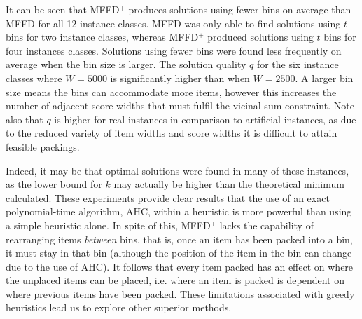 \documentclass[authoryear]{elsarticle}
\begin{document}
It can be seen that MFFD$^+$ produces solutions using fewer bins on average than MFFD for all 12 instance classes. MFFD was only able to find solutions using $t$ bins for two instance classes, whereas MFFD$^+$ produced solutions using $t$ bins for four instances classes. Solutions using fewer bins were found less frequently on average when the bin size is larger. The solution quality $q$ for the six instance classes where $W = 5000$ is significantly higher than when $W = 2500$. A larger bin size means the bins can accommodate more items, however this increases the number of adjacent score widths that must fulfil the vicinal sum constraint. Note also that $q$ is higher for real instances in comparison to artificial instances, as due to the reduced variety of item widths and score widths it is difficult to attain feasible packings. 

Indeed, it may be that optimal solutions were found in many of these instances, as the lower bound for $k$ may actually be higher than the theoretical minimum calculated. These experiments provide clear results that the use of an exact polynomial-time algorithm, AHC, within a heuristic is more powerful than using a simple heuristic alone. In spite of this, MFFD$^+$ lacks the capability of rearranging items \emph{between} bins, that is, once an item has been packed into a bin, it must stay in that bin (although the position of the item in the bin can change due to the use of AHC). It follows that every item packed has an effect on where the unplaced items can be placed, i.e. where an item is packed is dependent on where previous items have been packed. These limitations associated with greedy heuristics lead us to explore other superior methods.

\begin{comment}
{\color{myPink}
\begin{itemize}[leftmargin=*]
	\item Number of types on average real instances.
	\item Number of items per bin.
\end{itemize}
}
\end{comment}

\end{document}

